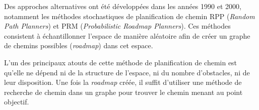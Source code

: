 \documentclass[../main.tex]{subfiles}
\begin{document}
Des approches alternatives ont été développées dans les années 1990 et 2000, notamment les méthodes stochastiques de planification de chemin RPP (\textit{Random Path Planners}) et PRM (\textit{Probabilistic Roadmap Planners}). Ces méthodes consistent à échantillonner l'espace de manière aléatoire afin de créer un graphe de chemins possibles (\textit{roadmap}) dans cet espace.\cite{amato_1996,hsu_2002,nissoux_1999}  

L'un des principaux atouts de cette méthode de planification de chemin est qu'elle ne dépend ni de la structure de l'espace, ni du nombre d'obstacles, ni de leur disposition. Une fois la \textit{roadmap} créée, il suffit d'utiliser une méthode de recherche de chemin dans un graphe pour trouver le chemin menant au point objectif.\cite{gasparetto_2015}
\end{document}
